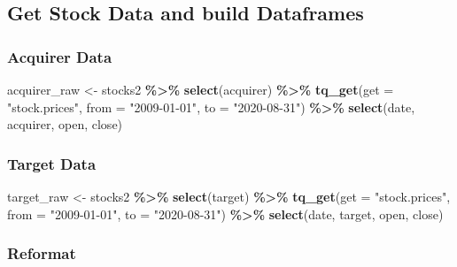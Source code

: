 \documentclass[
]{article}
\newenvironment{Shaded}{\begin{snugshade}}{\end{snugshade}}
\newcommand{\DataTypeTok}[1]{\textcolor[rgb]{0.13,0.29,0.53}{#1}}
\newcommand{\KeywordTok}[1]{\textcolor[rgb]{0.13,0.29,0.53}{\textbf{#1}}}
\newcommand{\NormalTok}[1]{#1}
\newcommand{\OperatorTok}[1]{\textcolor[rgb]{0.81,0.36,0.00}{\textbf{#1}}}
\newcommand{\StringTok}[1]{\textcolor[rgb]{0.31,0.60,0.02}{#1}}
\begin{document}
\hypertarget{get-stock-data-and-build-dataframes}{%
\subsection{Get Stock Data and build
Dataframes}\label{get-stock-data-and-build-dataframes}}

\hypertarget{acquirer-data}{%
\subsubsection{Acquirer Data}\label{acquirer-data}}

\begin{Shaded}
\begin{Highlighting}[]
\NormalTok{acquirer\_raw \textless{}{-}}\StringTok{ }\NormalTok{stocks2 }\OperatorTok{\%\textgreater{}\%}
\StringTok{  }\KeywordTok{select}\NormalTok{(acquirer) }\OperatorTok{\%\textgreater{}\%}\StringTok{ }
\StringTok{  }\KeywordTok{tq\_get}\NormalTok{(}\DataTypeTok{get  =} \StringTok{"stock.prices"}\NormalTok{,}
         \DataTypeTok{from =} \StringTok{"2009{-}01{-}01"}\NormalTok{,}
         \DataTypeTok{to   =} \StringTok{"2020{-}08{-}31"}\NormalTok{) }\OperatorTok{\%\textgreater{}\%}
\StringTok{  }\KeywordTok{select}\NormalTok{(date, acquirer, open, close)}
\end{Highlighting}
\end{Shaded}

\hypertarget{target-data}{%
\subsubsection{Target Data}\label{target-data}}

\begin{Shaded}
\begin{Highlighting}[]
\NormalTok{target\_raw \textless{}{-}}\StringTok{ }\NormalTok{stocks2 }\OperatorTok{\%\textgreater{}\%}\StringTok{ }
\StringTok{  }\KeywordTok{select}\NormalTok{(target) }\OperatorTok{\%\textgreater{}\%}\StringTok{ }
\StringTok{  }\KeywordTok{tq\_get}\NormalTok{(}\DataTypeTok{get  =} \StringTok{"stock.prices"}\NormalTok{,}
         \DataTypeTok{from =} \StringTok{"2009{-}01{-}01"}\NormalTok{,}
         \DataTypeTok{to   =} \StringTok{"2020{-}08{-}31"}\NormalTok{) }\OperatorTok{\%\textgreater{}\%}
\StringTok{  }\KeywordTok{select}\NormalTok{(date, target, open, close)}
\end{Highlighting}
\end{Shaded}

\hypertarget{reformat}{%
\subsubsection{Reformat}\label{reformat}}
\end{document}
